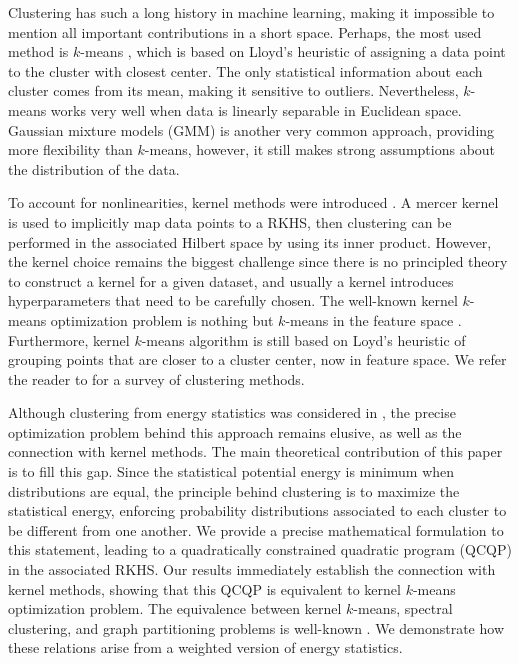 \documentclass[aps,preprint,nofootinbib,floatfix]{revtex4-1}
\begin{document}
Clustering has such a long history in machine learning, making it
impossible to mention all important contributions in a short space. 
Perhaps, the most used method is $k$-means \cite{Lloyd,MacQueen,Forgy}, which
is based on Lloyd's heuristic \cite{Lloyd} of assigning a data point to
the cluster with closest center. The only statistical 
information about each cluster comes from its mean, making it sensitive 
to outliers. Nevertheless, $k$-means works very well when data is 
linearly separable in Euclidean space. Gaussian mixture models (GMM) is 
another very common approach, providing more flexibility than $k$-means, 
however, it still makes strong assumptions about the distribution of 
the data.

To account for nonlinearities, kernel methods were introduced 
\cite{Smola,Girolami}. A mercer kernel \cite{Mercer} is used to implicitly
map data points to a RKHS, then clustering can be performed in the associated
Hilbert space by using its inner product. However, the kernel choice remains 
the biggest challenge since there is no principled theory to construct a kernel
for a given dataset, and usually a kernel introduces hyperparameters that 
need to be carefully chosen.
The well-known kernel $k$-means optimization problem is nothing but $k$-means 
in the feature space \cite{Girolami}. Furthermore, kernel $k$-means algorithm
\cite{Dhillon2,Dhillon} is still based on Loyd's heuristic \cite{Lloyd}
of grouping points that are closer to a cluster center, now
in feature space. 
We refer the reader to \cite{Filippone} for a survey of clustering
methods.

Although clustering from energy statistics was considered
in \cite{Kgroups}, the precise optimization problem behind this approach
remains elusive, as well as the connection with kernel methods.
The main theoretical contribution of this paper is to fill this gap.
Since the statistical potential energy is minimum when
distributions are equal, the principle behind clustering is to maximize 
the statistical energy,  enforcing probability distributions associated to 
each cluster to be different from one another. We provide a precise 
mathematical formulation to this statement, leading to a quadratically 
constrained quadratic program (QCQP) in the associated RKHS. Our results
immediately establish the connection with kernel methods, showing that this 
QCQP is equivalent to kernel $k$-means optimization problem. The 
equivalence between kernel $k$-means, spectral clustering, and graph 
partitioning problems is well-known \cite{Dhillon,Dhillon2}. We demonstrate 
how these relations arise from a weighted version of energy statistics.
\end{document}
